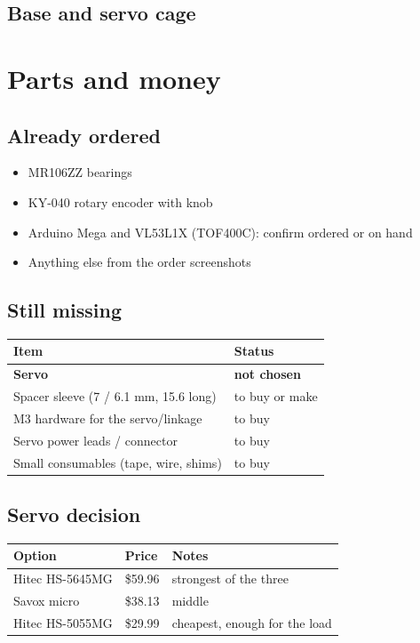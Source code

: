 \documentclass[11pt]{article}
\begin{document}
\subsection*{Base and servo cage}
\label{sec:orge5cd6e1}
\section*{Parts and money}
\label{sec:org06b4277}
\subsection*{Already ordered}
\label{sec:orgf8db982}
\begin{itemize}
\item MR106ZZ bearings
\item KY-040 rotary encoder with knob
\item Arduino Mega and VL53L1X (TOF400C): confirm ordered or on hand
\item Anything else from the order screenshots
\end{itemize}
\subsection*{Still missing}
\label{sec:org2265307}
\begin{center}
\begin{tabular}{ll}
Item & Status\\
\hline
\textbf{Servo} & \textbf{not chosen}\\
Spacer sleeve (7 / 6.1 mm, 15.6 long) & to buy or make\\
M3 hardware for the servo/linkage & to buy\\
Servo power leads / connector & to buy\\
Small consumables (tape, wire, shims) & to buy\\
\end{tabular}
\end{center}
\subsection*{Servo decision}
\label{sec:org5375c07}
\begin{center}
\begin{tabular}{lll}
Option & Price & Notes\\
\hline
Hitec HS-5645MG & \$59.96 & strongest of the three\\
Savox micro & \$38.13 & middle\\
Hitec HS-5055MG & \$29.99 & cheapest, enough for the load\\
\end{tabular}
\end{center}
\end{document}
